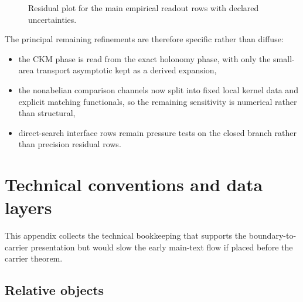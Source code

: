 \begin{figure}[t]
\centering
{}
\caption{Residual plot for the main empirical readout rows with declared uncertainties.}
\label{fig:residual-plot}
\end{figure}

The principal remaining refinements are therefore specific rather than diffuse:
\begin{itemize}[leftmargin=1.5em, topsep=3pt, itemsep=2pt]
    \item the CKM phase is read from the exact holonomy phase, with only the small-area transport asymptotic kept as a derived expansion,
    \item the nonabelian comparison channels now split into fixed local kernel data and explicit matching functionals, so the remaining sensitivity is numerical rather than structural,
    \item direct-search interface rows remain pressure tests on the closed branch rather than precision residual rows.
\end{itemize}

\section{Technical conventions and data layers}
\label{app:tech}

This appendix collects the technical bookkeeping that supports the boundary-to-carrier presentation but would slow the early main-text flow if placed before the carrier theorem.

\subsection{Relative objects}

